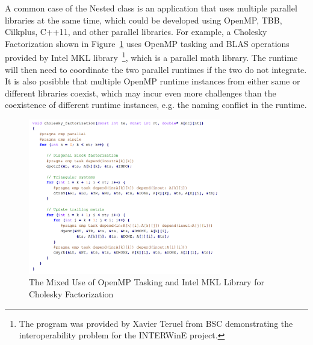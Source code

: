 A common case of the Nested class is an application that uses multiple parallel libraries at the same time, which could be developed 
using OpenMP, TBB, Cilkplus, C++11, and other parallel libraries. 
For example, a Cholesky Factorization shown in Figure~\ref{fig:cholesky} uses OpenMP 
tasking and BLAS operations provided by Intel MKL library~\footnote{The program was provided by Xavier Teruel from BSC demonstrating the interoperability problem for the INTERWinE project.}, 
which is a parallel math library. The runtime will then need to coordinate the two
parallel runtimes if the two do not integrate. %
It is also posibble that multiple OpenMP runtime instances from either same or different libraries coexist, which
may incur even more challenges than the coexistence of different runtime instances, e.g. the naming conflict 
in the runtime. 
\begin{figure}[h!]
  \centering
      \includegraphics[width=0.75\textwidth]{images/cholesky}
      \caption{The Mixed Use of OpenMP Tasking and Intel MKL Library for Cholesky Factorization~\cite{intertwine}}
 \label{fig:cholesky}
\end{figure}
